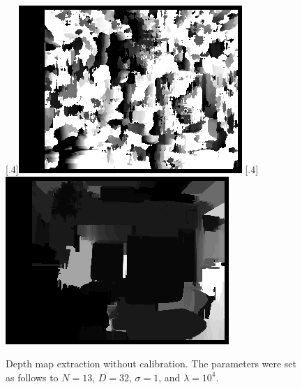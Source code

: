 \begin{figure}[h]
	\centering
	[.4\linewidth]{\includegraphics[scale=.3]{chapters/05_experiments/02_autonomous_walking/02_depth_map_parameter_tuning/disp_no_calib.png}}
	[.4\linewidth]{\includegraphics[scale=.3]{chapters/05_experiments/02_autonomous_walking/02_depth_map_parameter_tuning/wls_no_calib.png}}
	\caption{Depth map extraction without calibration. The parameters were set as follows to $N=13$, $D=32$, $\sigma = 1$, and $\lambda=10^4$.}
	\label{fig::522_no_calib}
\end{figure}
